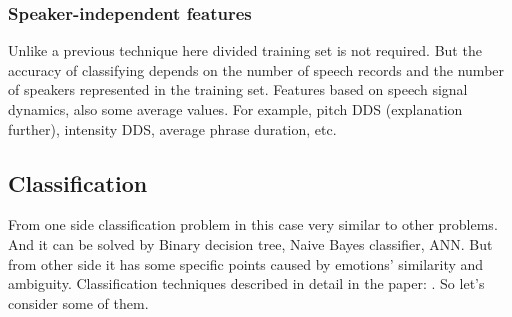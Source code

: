 \documentclass[14pt]{extarticle}
\begin{document}
\subsubsection{Speaker-independent features}
Unlike a previous technique here divided training set is not required. But the accuracy of classifying depends on the number of speech records and the number of speakers represented in the training set. Features based on speech signal dynamics, also some average values. For example, pitch DDS (explanation further), intensity DDS, average phrase duration, etc.


\subsection{Classification}
From one side classification problem in this case very similar to other problems. And it can be solved by Binary decision tree, Naive Bayes classifier, ANN. But from other side it has some specific points caused by emotions' similarity and ambiguity. Classification techniques described in detail in the paper: \cite["Speaker Emotion Recognition Based on Speech Features and Classification Techniques"]{SirishaSirvinasSiva}. So let's consider some of them.
\end{document}
